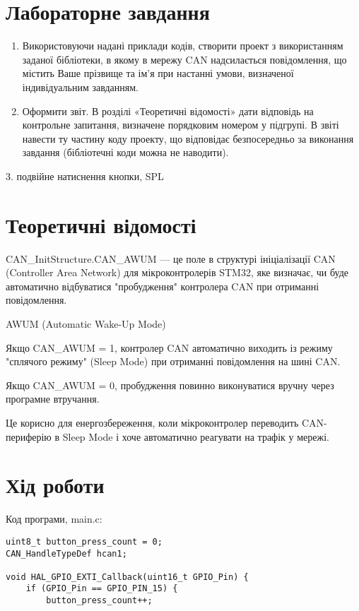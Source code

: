 \documentclass[oneside,14pt]{extarticle}
\begin{document}
\begin{normalsize}
  \section*{Лабораторне завдання}
  \begin{enumerate}
  	\item Використовуючи надані приклади кодів, створити проект з використанням
заданої бібліотеки, в якому в мережу CAN надсилається повідомлення, що
містить Ваше прізвище та ім'я при настанні умови, визначеної
індивідуальним завданням.
\item Оформити звіт. В розділі «Теоретичні відомості» дати відповідь на
контрольне запитання, визначене порядковим номером у підгрупі. В звіті
навести ту частину коду проекту, що відповідає безпосередньо за виконання
завдання (бібліотечні коди можна не наводити).
  \end{enumerate}
  
  3. подвійне натиснення кнопки, SPL
  
  \section*{Теоретичні відомості}
  
  CAN\_InitStructure.CAN\_AWUM — це поле в структурі ініціалізації CAN (Controller Area Network) для мікроконтролерів STM32, яке визначає, чи буде автоматично відбуватися "пробудження" контролера CAN при отриманні повідомлення.
  
  

    AWUM (Automatic Wake-Up Mode)

    Якщо CAN\_AWUM = 1, контролер CAN автоматично виходить із режиму "сплячого режиму" (Sleep Mode) при отриманні повідомлення на шині CAN.

    Якщо CAN\_AWUM = 0, пробудження повинно виконуватися вручну через програмне втручання.

Це корисно для енергозбереження, коли мікроконтролер переводить CAN-периферію в Sleep Mode і хоче автоматично реагувати на трафік у мережі.
  
  \section*{Хід роботи}
  
  Код програми, main.c:
  
	{\small\begin{lstlisting}
uint8_t button_press_count = 0;
CAN_HandleTypeDef hcan1;

void HAL_GPIO_EXTI_Callback(uint16_t GPIO_Pin) {
    if (GPIO_Pin == GPIO_PIN_15) {
        button_press_count++;


\end{lstlisting}}
\end{normalsize}
\end{document}
